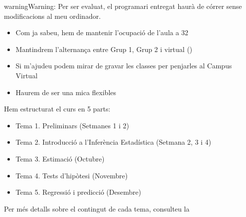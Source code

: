 \documentclass[letterpaper,10pt,english]{sphinxmanual}
\let\sphinxpxdimen\pdfpxdimen\else\newdimen\sphinxpxdimen
\begin{document}
\begin{sphinxadmonition}{warning}{Warning:}
Per ser evaluat, el programari entregat haurà de córrer sense modificacions al meu ordinador.
\end{sphinxadmonition}
\begin{itemize}
\item {} 
Com ja sabeu, hem de mantenir l’ocupació de l’aula a 32

\item {} 
Mantindrem l’alternança entre Grup 1, Grup 2 i virtual ()

\item {} 
Si m’ajudeu podem mirar de gravar les classes per penjar\sphinxhyphen{}les al Campus Virtual

\item {} 
Haurem de ser una mica flexibles

\end{itemize}

\begin{figure}[htbp]
\centering
\capstart

\noindent\sphinxincludegraphics[height=250\sphinxpxdimen]{{flexibilitat}.jpg}
\caption{}\label{\detokenize{0_Intro/0_0_Intro_curs:id3}}\end{figure}

Hem estructurat el curs en 5 parts:
\begin{itemize}
\item {} 
Tema 1. Preliminars (Setmanes 1 i 2)

\item {} 
Tema 2. Introducció a l’Inferència Estadística (Setmana 2, 3 i 4)

\item {} 
Tema 3. Estimació (Octubre)

\item {} 
Tema 4. Tests d’hipòtesi (Novembre)

\item {} 
Tema 5. Regressió i predicció (Desembre)

\end{itemize}

Per més detalls sobre el contingut de cada tema, consulteu la 
\end{document}
